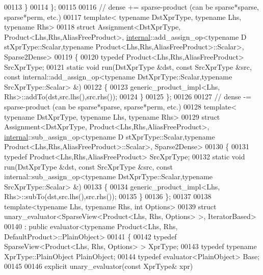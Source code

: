 \begin{DoxyCode}
00113   \}
00114 \};
00115 
00116 \textcolor{comment}{// dense += sparse-product (can be sparse*sparse, sparse*perm, etc.)}
00117 \textcolor{keyword}{template}< \textcolor{keyword}{typename} DstXprType, \textcolor{keyword}{typename} Lhs, \textcolor{keyword}{typename} Rhs>
00118 \textcolor{keyword}{struct }Assignment<DstXprType, Product<Lhs,Rhs,AliasFreeProduct>, \hyperlink{namespaceinternal}{internal}::add\_assign\_op<typename D
      stXprType::Scalar,typename Product<Lhs,Rhs,AliasFreeProduct>::Scalar>, Sparse2Dense>
00119 \{
00120   \textcolor{keyword}{typedef} Product<Lhs,Rhs,AliasFreeProduct> SrcXprType;
00121   \textcolor{keyword}{static} \textcolor{keywordtype}{void} run(DstXprType &dst, \textcolor{keyword}{const} SrcXprType &src, \textcolor{keyword}{const} internal::add\_assign\_op<typename
       DstXprType::Scalar,typename SrcXprType::Scalar> &)
00122   \{
00123     generic\_product\_impl<Lhs, Rhs>::addTo(dst,src.lhs(),src.rhs());
00124   \}
00125 \};
00126 
00127 \textcolor{comment}{// dense -= sparse-product (can be sparse*sparse, sparse*perm, etc.)}
00128 \textcolor{keyword}{template}< \textcolor{keyword}{typename} DstXprType, \textcolor{keyword}{typename} Lhs, \textcolor{keyword}{typename} Rhs>
00129 \textcolor{keyword}{struct }Assignment<DstXprType, Product<Lhs,Rhs,AliasFreeProduct>, \hyperlink{namespaceinternal}{internal}::sub\_assign\_op<typename D
      stXprType::Scalar,typename Product<Lhs,Rhs,AliasFreeProduct>::Scalar>, Sparse2Dense>
00130 \{
00131   \textcolor{keyword}{typedef} Product<Lhs,Rhs,AliasFreeProduct> SrcXprType;
00132   \textcolor{keyword}{static} \textcolor{keywordtype}{void} run(DstXprType &dst, \textcolor{keyword}{const} SrcXprType &src, \textcolor{keyword}{const} internal::sub\_assign\_op<typename
       DstXprType::Scalar,typename SrcXprType::Scalar> &)
00133   \{
00134     generic\_product\_impl<Lhs, Rhs>::subTo(dst,src.lhs(),src.rhs());
00135   \}
00136 \};
00137 
00138 \textcolor{keyword}{template}<\textcolor{keyword}{typename} Lhs, \textcolor{keyword}{typename} Rhs, \textcolor{keywordtype}{int} Options>
00139 \textcolor{keyword}{struct }unary\_evaluator<SparseView<Product<Lhs, Rhs, Options> >, IteratorBased>
00140  : \textcolor{keyword}{public} evaluator<typename Product<Lhs, Rhs, DefaultProduct>::PlainObject>
00141 \{
00142   \textcolor{keyword}{typedef} SparseView<Product<Lhs, Rhs, Options> > XprType;
00143   \textcolor{keyword}{typedef} \textcolor{keyword}{typename} XprType::PlainObject PlainObject;
00144   \textcolor{keyword}{typedef} evaluator<PlainObject> Base;
00145 
00146   \textcolor{keyword}{explicit} unary\_evaluator(\textcolor{keyword}{const} XprType& xpr)

\end{DoxyCode}
